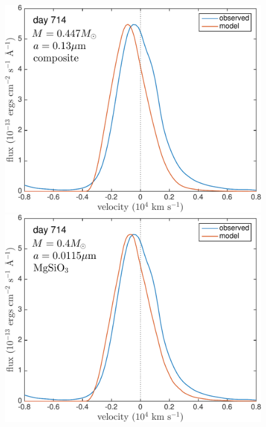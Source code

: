 \begin{landscape}
\begin{figure}
\centering
\includegraphics[trim =0 20 0 0,clip=true,scale=0.33]{chapters/chapter5/images/silicates_take2/composite_Dwek_Ha.pdf}
\includegraphics[trim =24 20 0 0,clip=true,scale=0.33]{chapters/chapter5/images/silicates_take2/MgSiO3_Dwek_Ha.pdf}

\end{figure}
\end{landscape}
